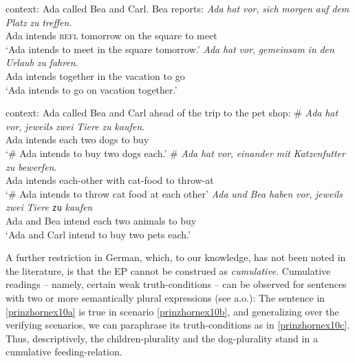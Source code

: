 \documentclass[output=paper,colorlinks,citecolor=brown,
]{langscibook}
\begin{document}
\ea \label{prinzhornex8} {\sc context: } Ada called Bea and Carl. Bea reports:
\ea \gll \textit{Ada} \textit{hat} \textit{vor}, \textit{sich} \textit{morgen} \textit{auf} \textit{dem} \textit{Platz} \textit{zu} \textit{treffen}.\\
   Ada intends {} \textsc{refl} tomorrow on the square to meet\\
\glt `Ada intends to meet in the square tomorrow.'\label{prinzhorncoll-pred}
\ex   \gll \textit{Ada} \textit{hat} \textit{vor}, \textit{gemeinsam} \textit{in} \textit{den} \textit{Urlaub} \textit{zu} \textit{fahren}.\\
   Ada intends {} together in the vacation to go\\
\glt `Ada intends to go on vacation together.'\label{prinzhornvaca}
\z \z



\ea \label{prinzhornex9} {\sc context: } Ada called Bea and Carl ahead of the trip to the pet shop:
\ea \gll $\#$ \textit{Ada} \textit{hat}  \textit{vor}, \textit{jeweils} \textit{zwei} \textit{Tiere} \textit{zu} \textit{kaufen}.\\
   {} Ada intends {} each two dogs to buy \\
\glt `$\#$ Ada intends to buy two dogs each.' \label{prinzhornex9a}
\ex   \gll $\#$ \textit{Ada} \textit{hat} \textit{vor}, \textit{einander} \textit{mit} \textit{Katzenfutter} \textit{zu} \textit{bewerfen}.\\
  {}  Ada intends {} each-other with cat-food to throw-at\\
\glt `$\#$ Ada intends to throw cat food at each other'  \label{prinzhornex9b}
\ex \gll \textit{Ada} \textit{und} \textit{Bea} \textit{haben} \textit{vor}, \textit{jeweils} \textit{zwei} \textit{Tiere} \texttt{zu} \textit{kaufen}\\
Ada and Bea intend {} each two animals to buy\\
\glt `Ada and Carl intend to buy two pets each.'\label{prinzhornex9c}
\z \z

A further restriction in German, which, to our knowledge, has not been noted in the literature, is that the EP cannot be construed as {\it cumulative}. Cumulative readings -- namely, certain weak truth-conditions -- can be observed for sentences with two or more semantically plural expressions (see \citealt{Langendoen:1978} a.o.): The sentence in \ref{prinzhornex10a} is true in  scenario \ref{prinzhornex10b}, and generalizing over the verifying scenarios, we can paraphrase its truth-conditions as in \ref{prinzhornex10c}.  Thus, descriptively, the children-plurality and the dog-plurality stand in a cumulative feeding-relation.
\end{document}
